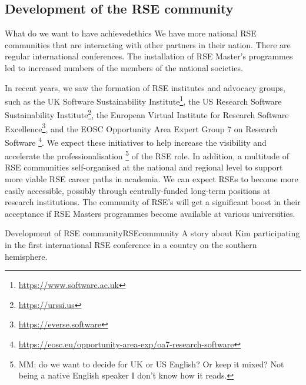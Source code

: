 \documentclass{eceasst}
\begin{document}
\subsection{Development of the RSE community}
\begin{whatis}{What do we want to have achieved}{ethics}
We have more national RSE communities that are interacting with other partners in their nation.
There are regular international conferences. The installation of RSE Master's programmes led to
increased numbers of the members of the national societies.
\end{whatis}
In recent years, we saw the formation of RSE institutes and advocacy groups, such as
the UK Software Sustainability Institute\footnote{\url{https://www.software.ac.uk}},
the US Research Software Sustainability Institute\footnote{\url{https://urssi.us}},
the European Virtual Institute for Research Software Excellence\footnote{\url{https://everse.software}},
and the EOSC Opportunity Area Expert Group 7 on Research Software%
\footnote{\url{https://eosc.eu/opportunity-area-exp/oa7-research-software}}.
We expect these initiatives to help increase the visibility and accelerate
the professionalisation%
\footnote{MM: do we want to decide for UK or US English? Or keep it mixed? Not being a native English speaker I don't know how it reads.}
of the RSE role.
In addition, a multitude of RSE communities self-organised at the national
and regional level to support more viable RSE career paths in academia.
We can expect RSEs to become more easily accessible,
possibly through centrally-funded long-term positions at research institutions.
The community of RSE's will get a significant boost in their acceptance if RSE Masters programmes
become available at various universities.

\begin{story}{Development of RSE community}{RSEcommunity}
A story about Kim participating in the first international RSE conference in a country on the southern hemisphere.
\end{story}
\end{document}
